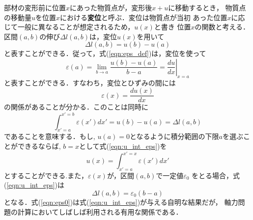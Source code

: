 \documentclass[11pt,a4j]{mybook2}
\begin{document}
部材の変形前に位置$x$にあった物質点が，変形後$x+u$に移動するとき，
物質点の移動量$u$を位置$x$における{\rm \bf 変位}と呼ぶ．変位は物質点が当初
あった位置$x$に応じて一般に異なることが想定されるため，$u(x)$と書き
位置$x$の関数と考える．
区間$(a,b)$の伸び$\Delta l(a,b)$は，変位$u(x)$を用いて
\begin{equation}
	\Delta l(a,b)=u(b)-u(a)
	\label{eqn:dell_u}
\end{equation}
と表すことができる．従って，式(\ref{eqn:eps_def})は，変位を使って
\begin{equation}
	\varepsilon(a) = \lim _{b\rightarrow a} \frac{u(b)-u(a)}{b-a}= \left.\frac{du}{dx}\right|_{x=a}
	\label{eqn:eps_u}
\end{equation}
と表すことができる．すなわち，変位とひずみの間には
\begin{equation}
	\varepsilon(x)=\frac{du(x)}{dx}
	\label{eqn:e_dudx}
\end{equation}
の関係があることが分かる．このことは同時に
\begin{equation}
	\int_{x'=a}^{x'=b} \varepsilon(x') dx'=u(b)-u(a)=\Delta l (a,b)
	\label{eqn:u_int_eps}
\end{equation}
であることを意味する．もし, $u(a)=0$となるように積分範囲の下限$a$を選ぶことができるならば, 
$b=x$として式(\ref{eqn:u_int_eps})を
\begin{equation}
	u(x)=\int_{x'=a}^{x'=x} \varepsilon(x') dx'
	\label{eqn:u_int_eps0}
\end{equation}
とすることができる.また，$\varepsilon(x)$が，区間$(a,b)$で一定値$\varepsilon_0$
をとる場合，式(\ref{eqn:u_int_eps})は
\begin{equation}
	\Delta l(a,b)=\varepsilon_0 (b-a)
	\label{eqn:eps0}
\end{equation}
となる．式(\ref{eqn:eps0})は式(\ref{eqn:u_int_eps})が与える自明な結果だが，
軸力問題の計算においてしばしば利用される有用な関係である．
\end{document}
